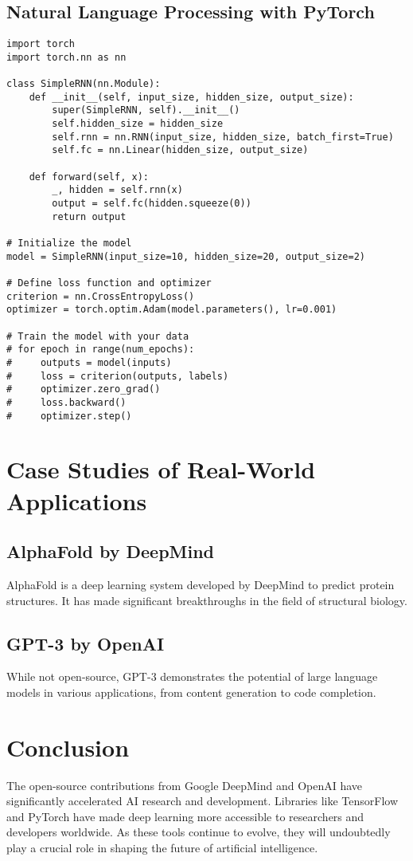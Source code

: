 \documentclass[
]{article}
\begin{document}
\subsection{Natural Language Processing with PyTorch}
\begin{verbatim}
import torch
import torch.nn as nn

class SimpleRNN(nn.Module):
    def __init__(self, input_size, hidden_size, output_size):
        super(SimpleRNN, self).__init__()
        self.hidden_size = hidden_size
        self.rnn = nn.RNN(input_size, hidden_size, batch_first=True)
        self.fc = nn.Linear(hidden_size, output_size)

    def forward(self, x):
        _, hidden = self.rnn(x)
        output = self.fc(hidden.squeeze(0))
        return output

# Initialize the model
model = SimpleRNN(input_size=10, hidden_size=20, output_size=2)

# Define loss function and optimizer
criterion = nn.CrossEntropyLoss()
optimizer = torch.optim.Adam(model.parameters(), lr=0.001)

# Train the model with your data
# for epoch in range(num_epochs):
#     outputs = model(inputs)
#     loss = criterion(outputs, labels)
#     optimizer.zero_grad()
#     loss.backward()
#     optimizer.step()
\end{verbatim}

\section{Case Studies of Real-World Applications}

\subsection{AlphaFold by DeepMind}

AlphaFold is a deep learning system developed by DeepMind to predict
protein structures. It has made significant breakthroughs in the field
of structural biology.

\subsection{GPT-3 by OpenAI}

While not open-source, GPT-3 demonstrates the potential of large
language models in various applications, from content generation to code
completion.

\section{Conclusion}

The open-source contributions from Google DeepMind and OpenAI have
significantly accelerated AI research and development. Libraries like
TensorFlow and PyTorch have made deep learning more accessible to
researchers and developers worldwide. As these tools continue to evolve,
they will undoubtedly play a crucial role in shaping the future of
artificial intelligence.
\end{document}
